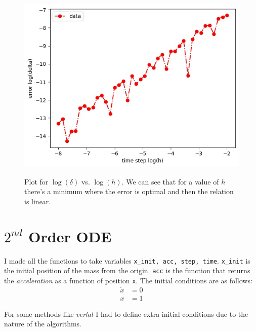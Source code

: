 \documentclass[12pt, a4paper]{article}
\begin{document}
	\begin{figure}[h!]
		\centering
		\includegraphics[width=0.8\linewidth]{../p1/error.jpg}
		\label{fig:error}
		\caption{Plot for \emph{$\log(\delta)$} vs. \emph{$\log(h)$}. We can see that for a value of $h$ there's a minimum where the error is optimal and then the relation is linear.}
	\end{figure}

	\section{$2^{nd}$ Order ODE}
	I made all the functions to take variables \texttt{x\_init, acc, step, time}. \texttt{x\_init} is the initial position of the mass from the origin.
	\texttt{acc} is the function that returns the \emph{acceleration} as a function of position \texttt{x}.
	The initial conditions are as follows:
	\begin{equation}
		\begin{aligned}
			\dot{x} &= 0\\
			x & = 1
		\end{aligned}
	\end{equation}
	
	For some methods like \emph{verlat} I had to define extra initial conditions due to the nature of the algorithms.
	
\end{document}
